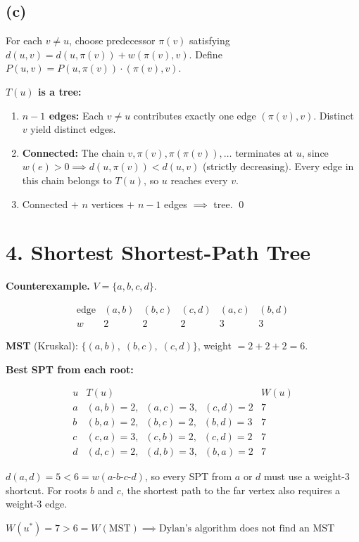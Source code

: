 \documentclass[11pt]{article}
\begin{document}
\subsection*{(c)}

For each $v \ne u$, choose predecessor $\pi(v)$ satisfying $d(u,v) = d(u,\pi(v)) + w(\pi(v),v)$. Define $P(u,v) = P(u,\pi(v)) \cdot (\pi(v),v)$.

\textbf{$T(u)$ is a tree:}
\begin{enumerate}[leftmargin=*,itemsep=2pt]
\item \textbf{$n-1$ edges:} Each $v \ne u$ contributes exactly one edge $(\pi(v),v)$. Distinct $v$ yield distinct edges.
\item \textbf{Connected:} The chain $v,\pi(v),\pi(\pi(v)),\ldots$ terminates at $u$, since $w(e) > 0 \implies d(u,\pi(v)) < d(u,v)$ (strictly decreasing). Every edge in this chain belongs to $T(u)$, so $u$ reaches every $v$.
\item Connected $+$ $n$ vertices $+$ $n-1$ edges $\implies$ tree. \qed
\end{enumerate}


\newpage
\section*{4. Shortest Shortest-Path Tree}

\textbf{Counterexample.} $V = \{a,b,c,d\}$.

\[
\begin{array}{c|ccccc}
\text{edge} & (a,b) & (b,c) & (c,d) & (a,c) & (b,d) \\ \hline
w & 2 & 2 & 2 & 3 & 3
\end{array}
\]

\textbf{MST} (Kruskal): $\{(a,b),\;(b,c),\;(c,d)\}$, weight $= 2 + 2 + 2 = 6$.

\textbf{Best SPT from each root:}

\[
\begin{array}{c|l|c}
u & T(u) & W(u) \\ \hline
a & (a,b)=2,\;\;(a,c)=3,\;\;(c,d)=2 & 7 \\
b & (b,a)=2,\;\;(b,c)=2,\;\;(b,d)=3 & 7 \\
c & (c,a)=3,\;\;(c,b)=2,\;\;(c,d)=2 & 7 \\
d & (d,c)=2,\;\;(d,b)=3,\;\;(b,a)=2 & 7
\end{array}
\]

$d(a,d) = 5 < 6 = w(a\text{-}b\text{-}c\text{-}d)$, so every SPT from $a$ or $d$ must use a weight-3 shortcut. For roots $b$ and $c$, the shortest path to the far vertex also requires a weight-3 edge.

$\boxed{W(u^*) = 7 > 6 = W(\text{MST}) \implies \text{Dylan's algorithm does not find an MST}}$
\end{document}
